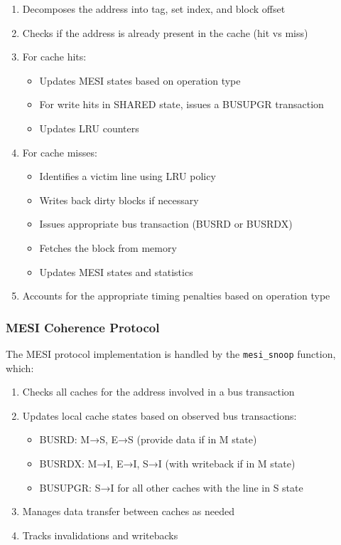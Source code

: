 \documentclass[11pt,a4paper]{article}
\begin{document}
    \begin{enumerate}[leftmargin=*]
        \item Decomposes the address into tag, set index, and block offset
        \item Checks if the address is already present in the cache (hit vs miss)
        \item For cache hits:
            \begin{itemize}
                \item Updates MESI states based on operation type
                \item For write hits in SHARED state, issues a BUSUPGR transaction
                \item Updates LRU counters
            \end{itemize}
        \item For cache misses:
            \begin{itemize}
                \item Identifies a victim line using LRU policy
                \item Writes back dirty blocks if necessary
                \item Issues appropriate bus transaction (BUSRD or BUSRDX)
                \item Fetches the block from memory
                \item Updates MESI states and statistics
            \end{itemize}
        \item Accounts for the appropriate timing penalties based on operation type
    \end{enumerate}

    \subsubsection{MESI Coherence Protocol}
    The MESI protocol implementation is handled by the \texttt{mesi\_snoop} function, which:

    \begin{enumerate}[leftmargin=*]
        \item Checks all caches for the address involved in a bus transaction
        \item Updates local cache states based on observed bus transactions:
            \begin{itemize}
                \item BUSRD: M→S, E→S (provide data if in M state)
                \item BUSRDX: M→I, E→I, S→I (with writeback if in M state)
                \item BUSUPGR: S→I for all other caches with the line in S state
            \end{itemize}
        \item Manages data transfer between caches as needed
        \item Tracks invalidations and writebacks
    \end{enumerate}
\end{document}
